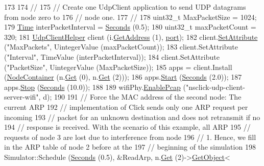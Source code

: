\begin{DoxyCode}
173 
174   \textcolor{comment}{//}
175   \textcolor{comment}{// Create one UdpClient application to send UDP datagrams from node zero to}
176   \textcolor{comment}{// node one.}
177   \textcolor{comment}{//}
178   uint32\_t MaxPacketSize = 1024;
179   \hyperlink{classns3_1_1Time}{Time} interPacketInterval = \hyperlink{group__timecivil_ga33c34b816f8ff6628e33d5c8e9713b9e}{Seconds} (0.5);
180   uint32\_t maxPacketCount = 320;
181   \hyperlink{classns3_1_1UdpClientHelper}{UdpClientHelper} client (i.\hyperlink{classns3_1_1Ipv4InterfaceContainer_ae63208dcd222be986822937ee4aa828c}{GetAddress} (1), \hyperlink{dsdv-manet_8cc_a8e0798404bf2cf5dabb84c5ba9a4f236}{port});
182   client.\hyperlink{classns3_1_1UdpClientHelper_a8bbae16a28f85ab3f3b5aa4642edfeae}{SetAttribute} (\textcolor{stringliteral}{"MaxPackets"}, UintegerValue (maxPacketCount));
183   client.SetAttribute (\textcolor{stringliteral}{"Interval"}, TimeValue (interPacketInterval));
184   client.SetAttribute (\textcolor{stringliteral}{"PacketSize"}, UintegerValue (MaxPacketSize));
185   apps = client.Install (\hyperlink{classns3_1_1NodeContainer}{NodeContainer} (n.\hyperlink{classns3_1_1NodeContainer_a9ed96e2ecc22e0f5a3d4842eb9bf90bf}{Get} (0), n.\hyperlink{classns3_1_1NodeContainer_a9ed96e2ecc22e0f5a3d4842eb9bf90bf}{Get} (2)));
186   apps.\hyperlink{classns3_1_1ApplicationContainer_a8eff87926507020bbe3e1390358a54a7}{Start} (\hyperlink{group__timecivil_ga33c34b816f8ff6628e33d5c8e9713b9e}{Seconds} (2.0));
187   apps.\hyperlink{classns3_1_1ApplicationContainer_adfc52f9aa4020c8714679b00bbb9ddb3}{Stop} (\hyperlink{group__timecivil_ga33c34b816f8ff6628e33d5c8e9713b9e}{Seconds} (10.0));
188 
189   wifiPhy.\hyperlink{classns3_1_1PcapHelperForDevice_a74866def9a881aa9d5c5be1225a26722}{EnablePcap} (\textcolor{stringliteral}{"nsclick-udp-client-server-wifi"}, d);
190 
191   \textcolor{comment}{// Force the MAC address of the second node: The current ARP}
192   \textcolor{comment}{// implementation of Click sends only one ARP request per incoming}
193   \textcolor{comment}{// packet for an unknown destination and does not retransmit if no}
194   \textcolor{comment}{// response is received. With the scenario of this example, all ARP}
195   \textcolor{comment}{// requests of node 3 are lost due to interference from node}
196   \textcolor{comment}{// 1. Hence, we fill in the ARP table of node 2 before at the}
197   \textcolor{comment}{// beginning of the simulation}
198   Simulator::Schedule (\hyperlink{group__timecivil_ga33c34b816f8ff6628e33d5c8e9713b9e}{Seconds} (0.5), &ReadArp, n.\hyperlink{classns3_1_1NodeContainer_a9ed96e2ecc22e0f5a3d4842eb9bf90bf}{Get} (2)->\hyperlink{classns3_1_1Object_a13e18c00017096c8381eb651d5bd0783}{GetObject}<

\end{DoxyCode}
